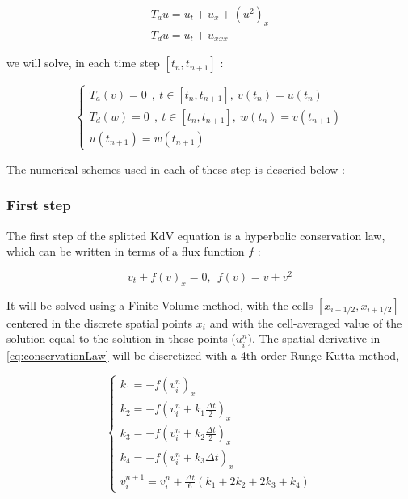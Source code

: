 \begin{equation}
  \begin{split}
	T_a{u} = u_t + u_x + (u^2)_x \\
	T_d{u} = u_t + u_{xxx}
	\end{split}
\end{equation}
 
 we will solve, in each time step $[t_n,t_{n+1}]$ :

\begin{equation}
\begin{cases}
   T_a(v) = 0 \ \ ,\ t \in [t_n,t_{n+1}], \  v(t_n) = u(t_n) \\
   T_d(w) = 0 \ \ , \ t \in [t_n,t_{n+1}], \  w(t_n) = v(t_{n+1}) \\
    u(t_{n+1}) = w(t_{n+1})
\end{cases}
\end{equation}

\indent The numerical schemes used in each of these step is descried below :

\subsubsection{First step}
\label{sec:KdVSplitted1}

\indent The first step of the splitted KdV equation is a hyperbolic conservation law, which can be written in terms of a flux function $f$ :

\begin{equation}
  \label{eq:conservationLaw}
	v_t + f(v)_x = 0, \ \ f(v) = v + v^2
\end{equation}

\indent It will be solved using a Finite Volume method, with the cells $[x_{i-1/2}, x_{i+1/2}]$ centered in the discrete spatial points $x_i$ and with the cell-averaged value of the solution equal to the solution in these points ($u_i^n$). The spatial derivative in \eqref{eq:conservationLaw} will be discretized with a 4th order Runge-Kutta method,

\begin{equation}
\begin{cases}
k_1 = - f(v_i^n)_x \\
k_2 = - f\left(v_i^n + k_1\frac{\Delta t }{2}\right)_x \\
k_3 = - f\left(v_i^n + k_2\frac{\Delta t }{2}\right)_x \\
k_4 = - f(v_i^n + k_3 \Delta t)_x \\
v_i^{n+1} = v_i^n + \frac{\Delta t}{6}(k_1 + 2k_2 + 2k_3 + k_4)
\end{cases}
\end{equation}

